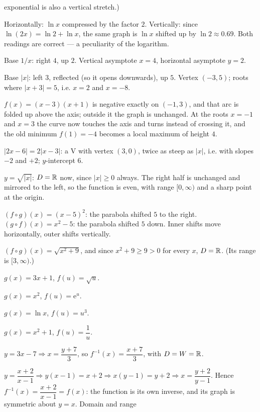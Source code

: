 \begin{solutions}
        exponential is also a vertical stretch.)
  \item Horizontally: $\ln x$ compressed by the factor $2$. Vertically:
        since $\ln(2x)=\ln 2+\ln x$, the same graph is $\ln x$ shifted up
        by $\ln2\approx0.69$. Both readings are correct --- a peculiarity
        of the logarithm.
  \item Base $1/x$: right $4$, up $2$. Vertical asymptote $x=4$,
        horizontal asymptote $y=2$.
  \item Base $|x|$: left $3$, reflected (so it opens downwards), up $5$.
        Vertex $(-3,5)$; roots where $|x+3|=5$, i.e. $x=2$ and $x=-8$.
  \item $f(x)=(x-3)(x+1)$ is negative exactly on $(-1,3)$, and that arc is
        folded up above the axis; outside it the graph is unchanged. At the
        roots $x=-1$ and $x=3$ the curve now touches the axis and turns
        instead of crossing it, and the old minimum $f(1)=-4$ becomes a
        local maximum of height $4$.
  \item $|2x-6|=2|x-3|$: a V with vertex $(3,0)$, twice as steep as
        $|x|$, i.e. with slopes $-2$ and $+2$; $y$-intercept $6$.
  \item $y=\sqrt{|x|}$: $D=\mathbb{R}$ now, since $|x|\geq0$ always. The right half
        is unchanged and mirrored to the left, so the function is even,
        with range $[0,\infty)$ and a sharp point at the origin.
  \item $(f\circ g)(x)=(x-5)^{2}$: the parabola shifted $5$ to the right.
        $(g\circ f)(x)=x^{2}-5$: the parabola shifted $5$ down. Inner
        shifts move horizontally, outer shifts vertically.
  \item $(f\circ g)(x)=\sqrt{x^{2}+9}$, and since $x^{2}+9\geq9>0$ for
        every $x$, $D=\mathbb{R}$. (Its range is $[3,\infty)$.)
  \item $g(x)=3x+1$, $f(u)=\sqrt{u}$.
  \item $g(x)=x^{2}$, $f(u)=\mathrm{e}^{u}$.
  \item $g(x)=\ln x$, $f(u)=u^{3}$.
  \item $g(x)=x^{2}+1$, $f(u)=\dfrac{1}{u}$.
  \item $y=3x-7\Rightarrow x=\dfrac{y+7}{3}$, so
        $f^{-1}(x)=\dfrac{x+7}{3}$, with $D=W=\mathbb{R}$.
  \item $y=\dfrac{x+2}{x-1}\Rightarrow y(x-1)=x+2\Rightarrow x(y-1)=y+2
        \Rightarrow x=\dfrac{y+2}{y-1}$. Hence
        $f^{-1}(x)=\dfrac{x+2}{x-1}=f(x)$: the function is its own
        inverse, and its graph is symmetric about $y=x$. Domain and range

\end{solutions}
